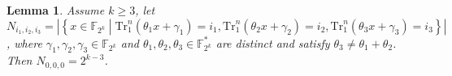 \documentclass[runningheads,a4paper]{article}
\newtheorem{lemma}{Lemma}
\newcommand{\F}{\mathbb{F}}
\newcommand{\0}{\textbf{0}}
\newcommand{\1}{\textbf{1}}
\renewcommand{\Tr}{\mathrm{Tr}_1^n}
\begin{document}
 \begin{lemma}\label{lemma:N_ijk_tracefunction}
    Assume  $ k\ge 3 $, 
  let $ N_{i_1,i_2,i_3}=\left\lvert\left\{x\in\F_{2^k}\middle| \Tr\left(\theta_1x+\gamma_1\right)=i_1,\Tr\left(\theta_2x+\gamma_2\right)=i_2,\Tr\left(\theta_3x+\gamma_3\right)=i_3 \right\} \right\rvert$, 
  where  $ \gamma_1,\gamma_2,\gamma_3\in\F_{2^k} $ and $ \theta_1,\theta_2,\theta_3\in\F_{2^k}^* $ are distinct and satisfy 
  $ \theta_3\ne\theta_1+\theta_2 $. Then $ N_{0,0,0}= 2^{k-3} $.
\end{lemma}
\end{document}
